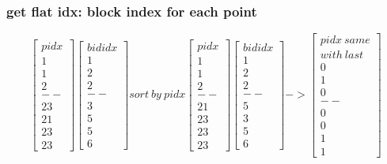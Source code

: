 \documentclass[,table,dvipsnames]{article}
\begin{document}
\subsubsection{get flat idx: block index for each point}
\[  
\begin{bmatrix}
pidx \\ 1 \\ 1 \\2 \\-- \\ 23\\21 \\23\\23
\end{bmatrix}
\begin{bmatrix}
bididx  \\ 1 \\ 2 \\2 \\-- \\ 3 \\ 5 \\ 5\\6
\end{bmatrix}
sort\ by\ pidx
\begin{bmatrix}
pidx \\ 1 \\ 1 \\2 \\-- \\ 21 \\  23 \\23\\23
\end{bmatrix}
\begin{bmatrix}
bididx  \\ 1 \\ 2 \\2 \\-- \\ 5 \\ 3 \\ 5\\6
\end{bmatrix}
->
\begin{bmatrix}
pidx\ same\\ with\ last  \\ 0 \\ 1 \\0 \\-- \\ 0 \\ 0 \\ 1 \\ 1

\end{bmatrix}\]
\end{document}
